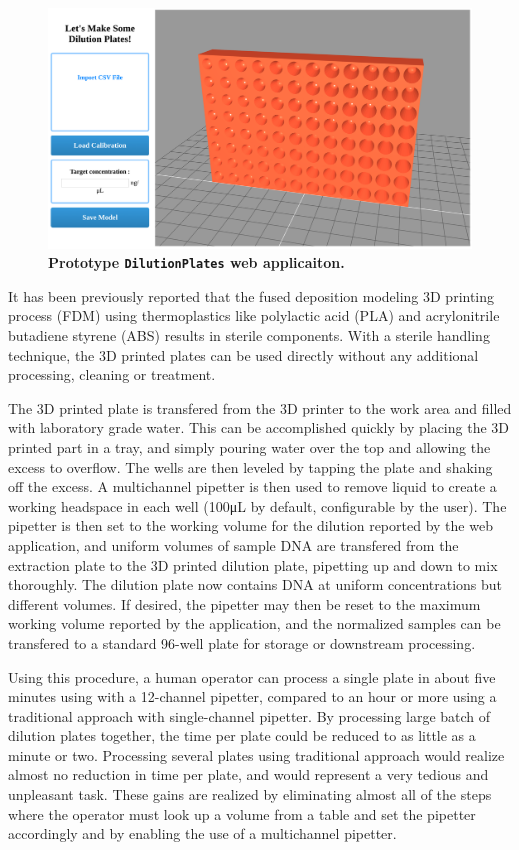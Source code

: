 \begin{refsection}
\begin{figure}
    \centering
    \includegraphics[width=\textwidth]{DilutionPlates/figures/fig1}
    \caption{\textbf{Prototype {\tt DilutionPlates} web applicaiton.}}
    \label{DP_fig1}
\end{figure}

It has been previously reported that the fused deposition modeling 3D printing process (FDM) using thermoplastics like polylactic acid (PLA) and acrylonitrile butadiene styrene (ABS) results in sterile components. With a sterile handling technique, the 3D printed plates can be used directly without any additional processing, cleaning or treatment.

The 3D printed plate is transfered from the 3D printer to the work area and filled with laboratory grade water. This can be accomplished quickly by placing the 3D printed part in a tray, and simply pouring water over the top and allowing the excess to overflow. The wells are then leveled by tapping the plate and shaking off the excess. A multichannel pipetter is then used to remove liquid to create a working headspace in each well (100\si{\micro\liter} by default, configurable by the user). The pipetter is then set to the working volume for the dilution reported by the web application, and uniform volumes of sample DNA are transfered from the extraction plate to the 3D printed dilution plate, pipetting up and down to mix thoroughly. The dilution plate now contains DNA at uniform concentrations but different volumes. If desired, the pipetter may then be reset to the maximum working volume reported by the application, and the normalized samples can be transfered to a standard 96-well plate for storage or downstream processing.



Using this procedure, a human operator can process a single plate in about five minutes using with a 12-channel pipetter, compared to an hour or more using a traditional approach with single-channel pipetter. By processing large batch of dilution plates together, the time per plate could be reduced to as little as a minute or two. Processing several plates using traditional approach would realize almost no reduction in time per plate, and would represent a very tedious and unpleasant task. These gains are realized by eliminating almost all of the steps where the operator must look up a volume from a table and set the pipetter accordingly and by enabling the use of a multichannel pipetter.


\end{refsection}
